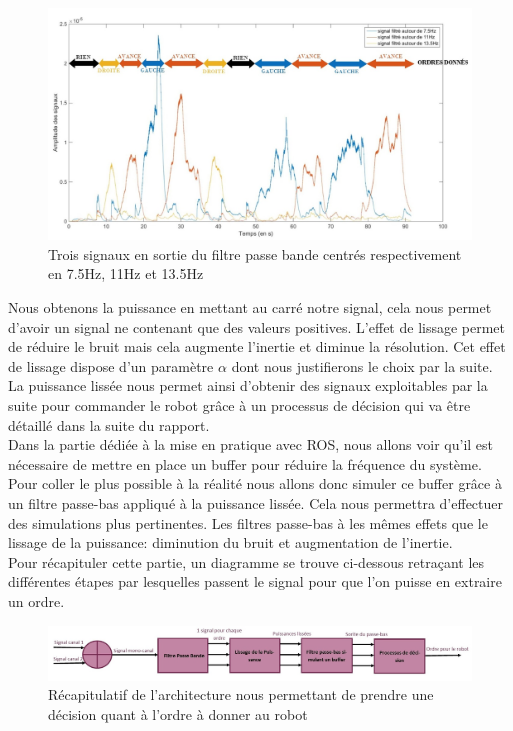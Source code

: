 \documentclass[11pt]{article}
\begin{document}
\begin{figure}[!h]
	\includegraphics[scale=0.75]{images/puissancelissee.jpg}
	\caption{Trois signaux en sortie du filtre passe bande centrés respectivement en 7.5Hz, 11Hz et 13.5Hz}
	\label{fig:duck}
\end{figure}

Nous obtenons la puissance en mettant au carré notre signal, cela nous permet d'avoir un signal ne contenant que des valeurs positives. L'effet de lissage permet de réduire le bruit mais cela augmente l'inertie et diminue la résolution. Cet effet de lissage dispose d'un paramètre $ \alpha $ dont nous justifierons le choix par la suite. 
La puissance lissée nous permet ainsi d'obtenir des signaux exploitables par la suite pour commander le robot grâce à un processus de décision qui va être détaillé dans la suite du rapport. \\

Dans la partie dédiée à la mise en pratique avec ROS, nous allons voir qu'il est nécessaire de mettre en place un buffer pour réduire la fréquence du système. Pour coller le plus possible à la réalité nous allons donc simuler ce buffer grâce à un filtre passe-bas appliqué à la puissance lissée. Cela nous permettra d'effectuer des simulations plus pertinentes. Les filtres passe-bas à les mêmes effets que le lissage de la puissance: diminution du bruit et augmentation de l'inertie.\\

Pour récapituler cette partie, un diagramme se trouve ci-dessous retraçant les différentes étapes par lesquelles passent le signal pour que l'on puisse en extraire un ordre. \\


\begin{figure}[!h]
	\includegraphics[scale=0.65]{images/diagramme.jpg}
	\caption{Récapitulatif de l'architecture nous permettant de prendre une décision quant à l'ordre à donner au robot}
	\label{fig:duck}
\end{figure}
\end{document}
